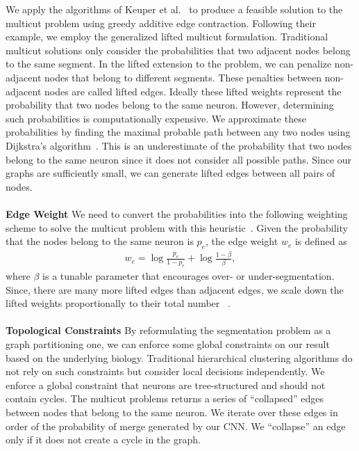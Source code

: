 We apply the algorithms of Keuper et al.~\cite{keuper2015efficient} to produce a feasible solution to the multicut problem using greedy additive edge contraction.
Following their example, we employ the generalized lifted multicut formulation.
Traditional multicut solutions only consider the probabilities that two adjacent nodes belong to the same segment. 
In the lifted extension to the problem, we can penalize non-adjacent nodes that belong to different segments. 
These penalties between non-adjacent nodes are called lifted edges. 
Ideally these lifted weights represent the probability that two nodes belong to the same neuron.
However, determining such probabilities is computationally expensive.
We approximate these probabilities by finding the maximal probable path between any two nodes using Dijkstra's algorithm~\cite{keuper2015efficient}.
This is an underestimate of the probability that two nodes belong to the same neuron since it does not consider all possible paths.
Since our graphs are sufficiently small, we can generate lifted edges between all pairs of nodes. 
\\~\\
\noindent\textbf{Edge Weight} 
We need to convert the probabilities into the following weighting scheme to solve the multicut problem with this heuristic~\cite{keuper2015efficient,andres2011probabilistic}.
Given the probability that the nodes belong to the same neuron is $p_e$, the edge weight $w_e$ is defined as
\begin{align}
w_e = \log{\frac{p_e}{1 - p_e}} + \log{\frac{1 - \beta}{\beta}},
\end{align}
where $\beta$ is a tunable parameter that encourages over- or under-segmentation. 
Since, there are many more lifted edges than adjacent edges, we scale down the lifted weights proportionally to their total number  
~\cite{beier2017multicut}.
\\~\\
\noindent\textbf{Topological Constraints}
By reformulating the segmentation problem as a graph partitioning one, we can enforce some global constraints on our result based on the underlying biology.
Traditional hierarchical clustering algorithms do not rely on such constraints but consider local decisions independently.
We enforce a global constraint that neurons are tree-structured and should not contain cycles. 
The multicut problems returns a series of ``collapsed'' edges between nodes that belong to the same neuron.
We iterate over these edges in order of the probability of merge generated by our CNN. 
We ``collapse'' an edge only if it does not create a cycle in the graph.

